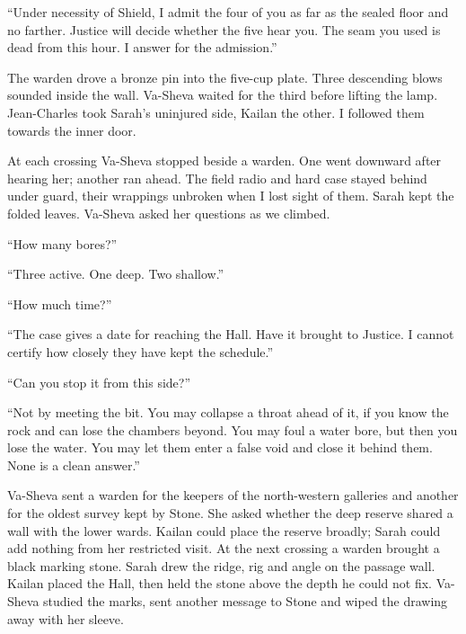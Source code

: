``Under necessity of Shield, I admit the four of you as far as the sealed floor and no farther. Justice will decide whether the five hear you. The seam you used is dead from this hour. I answer for the admission.''\par

The warden drove a bronze pin into the five-cup plate. Three descending blows sounded inside the wall. Va-Sheva waited for the third before lifting the lamp. Jean-Charles took Sarah's uninjured side, Kailan the other. I followed them towards the inner door.\par

At each crossing Va-Sheva stopped beside a warden. One went downward after hearing her; another ran ahead. The field radio and hard case stayed behind under guard, their wrappings unbroken when I lost sight of them. Sarah kept the folded leaves. Va-Sheva asked her questions as we climbed.\par

``How many bores?''\par

``Three active. One deep. Two shallow.''\par

``How much time?''\par

``The case gives a date for reaching the Hall. Have it brought to Justice. I cannot certify how closely they have kept the schedule.''\par

``Can you stop it from this side?''\par

``Not by meeting the bit. You may collapse a throat ahead of it, if you know the rock and can lose the chambers beyond. You may foul a water bore, but then you lose the water. You may let them enter a false void and close it behind them. None is a clean answer.''\par

Va-Sheva sent a warden for the keepers of the north-western galleries and another for the oldest survey kept by Stone. She asked whether the deep reserve shared a wall with the lower wards. Kailan could place the reserve broadly; Sarah could add nothing from her restricted visit. At the next crossing a warden brought a black marking stone. Sarah drew the ridge, rig and angle on the passage wall. Kailan placed the Hall, then held the stone above the depth he could not fix. Va-Sheva studied the marks, sent another message to Stone and wiped the drawing away with her sleeve.\par

